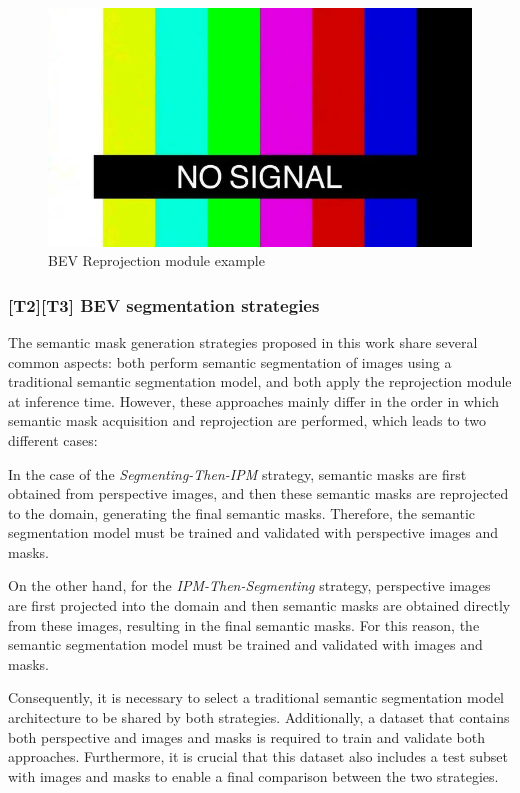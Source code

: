 \begin{figure}[h!]
    \centering
    \includegraphics[width=\linewidth]{./images/shared/no_signal.jpg}
    \caption{BEV Reprojection module example}
    \label{fig:bev_reprojection}
\end{figure}


\subsubsection{[T2][T3] BEV segmentation strategies}
The  semantic mask generation strategies proposed in this work share several common aspects: both perform semantic segmentation of images using a traditional semantic segmentation model, and both apply the  reprojection module at inference time. However, these approaches mainly differ in the order in which semantic mask acquisition and reprojection are performed, which leads to two different cases:

In the case of the \textit{Segmenting-Then-IPM} strategy, semantic masks are first obtained from perspective images, and then these semantic masks are reprojected to the  domain, generating the final  semantic masks. Therefore, the semantic segmentation model must be trained and validated with perspective images and masks.

On the other hand, for the \textit{IPM-Then-Segmenting} strategy, perspective images are first projected into the  domain and then semantic masks are obtained directly from these  images, resulting in the final  semantic masks. For this reason, the semantic segmentation model must be trained and validated with  images and masks.

Consequently, it is necessary to select a traditional semantic segmentation model architecture to be shared by both strategies. Additionally, a dataset that contains both perspective and  images and masks is required to train and validate both approaches. Furthermore, it is crucial that this dataset also includes a test subset with  images and masks to enable a final comparison between the two strategies.


